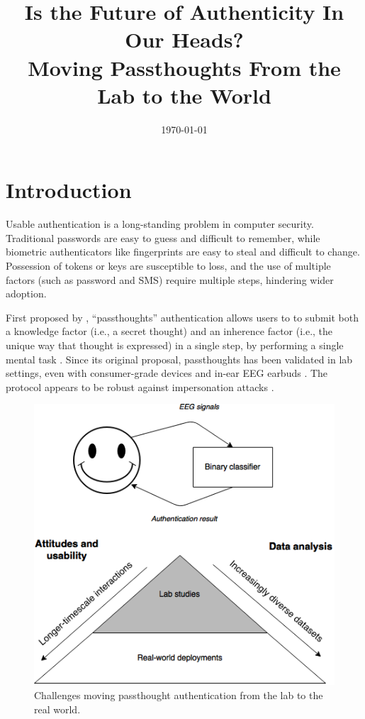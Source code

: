 \documentclass[sigconf]{acmart}
\date{\today}
\title{Is the Future of Authenticity In Our Heads?\\\medskip
\large Moving Passthoughts From the Lab to the World}
\begin{document}
\maketitle

\section{Introduction}
\label{sec:org5898499}

Usable authentication is a long-standing problem in computer security.
Traditional passwords are easy to guess and difficult to remember,
while biometric authenticators like fingerprints are easy to steal and difficult to change.
Possession of tokens or keys are susceptible to loss, 
and the use of multiple factors (such as password and SMS) require multiple steps, hindering wider adoption.

First proposed by \cite{Thorpe2005}, ``passthoughts'' authentication allows users to 
to submit both a knowledge factor (i.e., a secret thought) and an inherence factor (i.e., the unique way that thought is expressed)
in a single step, by performing a single mental task \cite{Johnson2014}.
Since its original proposal, passthoughts has been validated in lab settings, even with 
consumer-grade devices \cite{Chuang2013b} and in-ear EEG earbuds \cite{curranpassthoughts}.
The protocol appears to be robust against impersonation attacks \cite{Johnson2014}.


\label{fig:diagram}
\begin{figure}[htbp]
\centering
\includegraphics[width=.9\linewidth]{./figures/passthoughts-diagram.png}
\caption{Challenges moving passthought authentication from the lab to the real world.}
\end{figure}
\end{document}
